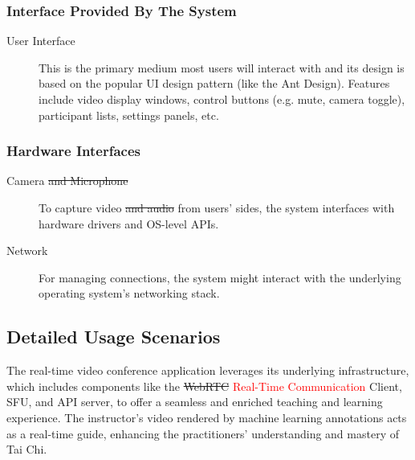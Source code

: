 \documentclass[12pt]{article}
\begin{document}
\subsubsection{Interface Provided By The System}
\begin{description}
    \item[User Interface] This is the primary medium most users will interact with and its design is based on the popular UI design pattern (like the Ant Design). Features include video display windows, control buttons (e.g. mute, camera toggle), participant lists, settings panels, etc.
\end{description}
\subsubsection{Hardware Interfaces}
\begin{description}
    \item[Camera \sout{and Microphone}] To capture video \sout{and audio} from users’ sides, the system interfaces with hardware drivers and OS-level APIs.
    \item[Network] For managing connections, the system might interact with the underlying operating system’s networking stack.
\end{description}
\subsection{Detailed Usage Scenarios}
The real-time video conference application leverages its underlying infrastructure, which includes components like the \sout{WebRTC} \textcolor{red}{Real-Time Communication} Client, SFU, and API server, to offer a seamless and enriched teaching and learning experience. The instructor's video rendered by machine learning annotations acts as a real-time guide, enhancing the practitioners' understanding and mastery of Tai Chi.
\end{document}
